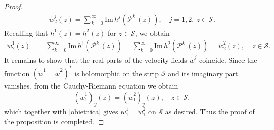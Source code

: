 \documentclass[10pt,a4paper]{amsart}
\def\PP{\mathcal{P}}
\def\SS{\mathcal{S}}
\begin{document}
\begin{proof}
\begin{align*}
\tilde{w}_{2}^j(z) = \sum_{k=0}^{\infty}\mathrm{Im}\, h^j(\PP_{-}^{k}(z)), \quad j=1,2, \ z\in\SS.
\end{align*}
Recalling that $h^1(z) = h^2(z)$ for $z\in\SS$, we obtain
\begin{align*}
\tilde{w}_{2}^1(z) & = \sum_{k=0}^{\infty}\mathrm{Im}\, h^1(\PP_{-}^{k}(z)) = \sum_{k=0}^{\infty}\mathrm{Im}\, h^2(\PP_{-}^{k}(z)) = \tilde{w}_{2}^2(z), \quad z\in\SS.
\end{align*}
It remains to show that the real parts of the velocity fields $\tilde w^{j}$ coincide. Since the function $(\tilde{w}^{1}-\tilde{w}^{2})^{*}$ is holomorphic on the strip $\SS$ and its imaginary part vanishes, from the Cauchy-Riemann equation we obtain $$(\tilde{w}^{1}_{1})_{y}(z) = (\tilde{w}^{2}_{1})_{y}(z), \quad z\in\SS,$$ which together with \eqref{obietnica} gives
$\tilde{w}^{1}_{1} = \tilde{w}^{2}_{1}$ on $\SS$ as desired. Thus the proof of the proposition is completed. 
\end{proof}
\end{document}
